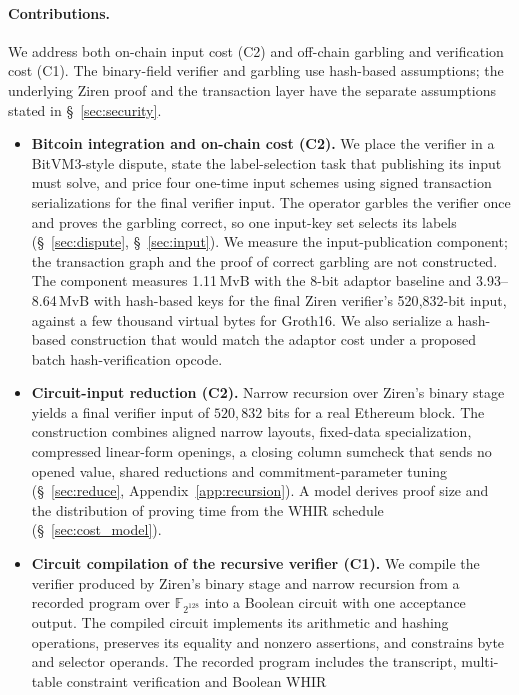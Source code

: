 \documentclass[11pt]{article}
\newcommand{\F}{\mathbb{F}_{2^{128}}}
\begin{document}
\paragraph{Contributions.} We address both on-chain input cost (C2) and
off-chain garbling and verification cost (C1). The binary-field
verifier and garbling use hash-based assumptions; the underlying Ziren proof
and the transaction layer have the separate assumptions stated in
\S~\ref{sec:security}.
\begin{itemize}
  \item \textbf{Bitcoin integration and on-chain cost (C2).} We place the
    verifier in a BitVM3-style dispute, state the label-selection task that
    publishing its input must solve, and price four one-time input schemes
    using signed transaction serializations for the final verifier input.
    The operator garbles the verifier once and proves the garbling correct, so one input-key set selects its labels (\S~\ref{sec:dispute}, \S~\ref{sec:input}). We measure the input-publication component; the transaction graph and the proof of correct garbling are not constructed. The component
    measures 1.11\,MvB with the 8-bit adaptor baseline and 3.93--8.64\,MvB
    with hash-based keys for the final Ziren verifier's 520{,}832-bit input,
    against a few thousand virtual bytes for Groth16. We also
    serialize a hash-based construction that would match the adaptor cost under a proposed batch hash-verification opcode.
  \item \textbf{Circuit-input reduction (C2).} Narrow recursion over Ziren's binary
    stage yields a final verifier input of $520{,}832$ bits for a real
    Ethereum block. The construction combines
    aligned narrow layouts, fixed-data specialization, compressed linear-form
    openings, a closing column sumcheck that sends no opened value, shared
    reductions and commitment-parameter tuning
    (\S~\ref{sec:reduce}, Appendix~\ref{app:recursion}).
    A model derives proof size and the distribution of proving time
    from the WHIR schedule (\S~\ref{sec:cost_model}).
  \item \textbf{Circuit compilation of the recursive verifier (C1).}
    We compile the verifier produced by Ziren's binary stage and narrow
    recursion from a recorded program over $\F$ into a Boolean circuit with
    one acceptance output. The compiled circuit implements its arithmetic and
    hashing operations, preserves its equality and nonzero assertions, and
    constrains byte and selector operands. The recorded program includes the
    transcript, multi-table constraint verification and Boolean WHIR

\end{itemize}
\end{document}
